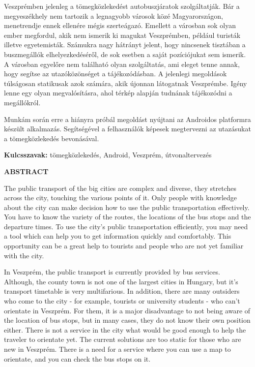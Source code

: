 \documentclass[a4paper,oneside,10pt]{report}
\begin{document}
Veszprémben jelenleg a tömegközlekedést autobuszjáratok szolgáltatják.
Bár a megyeszékhely nem tartozik a legnagyobb városok közé Magyarországon, menetrendje ennek ellenére mégis szerteágazó.
Emellett a városban sok olyan ember megfordul, akik nem ismerik ki magukat Veszprémben, például turisták illetve egyetemisták.
Számukra nagy hátrányt jelent, hogy nincsenek tisztában a buszmegállók elhelyezkedéséről, de sok esetben a saját pozíciójukat sem ismerik.
A városban egyelőre nem található olyan szolgáltatás, ami eleget tenne annak, hogy segítse az utazóközönséget a tájékozódásban.
A jelenlegi megoldások túlságosan statikusak azok számára, akik újonnan látogatnak Veszprémbe.
Igény lenne egy olyan megvalósításra, ahol térkép alapján tudnának tájékozódni a megállókról.

Munkám során erre a hiányra próbál megoldást nyújtani az Androidos platformra készült alkalmazás.
Segítségével a felhasználók képesek megtervezni az utazásukat a tömegközlekedés bevonásával.

\textbf{Kulcsszavak:} tömegközlekedés, Android, Veszprém, útvonaltervezés

\newpage

\Large
\begin{center}
	\textbf{ABSTRACT}
\end{center}
\normalsize
\noindent
The public transport of the big cities are complex and diverse, they stretches across the city, touching the various points of it.
Only people with knowledge about the city can make decision how to use the public transportation effectively.
You have to know the variety of the routes, the locations of the bus stops and the departure times.
To use the city's public transportation efficiently, you may need a tool which can help you to get information quickly and comfortably.
This opportunity can be a great help to tourists and people who are not yet familiar with the city.

In Veszprém, the public transport is currently provided by bus services.
Although, the county town is not one of the largest cities in Hungary, but it's transport timetable is very multifarious.
In addition, there are many outsiders who come to the city - for example, tourists or university students - who can't orientate in Veszprém.
For them, it is a major disadvantage to not being aware of the location of bus stops, but in many cases, they do not know their own position either.
There is not a service in the city what would be good enough to help the traveler to orientate yet.
The current solutions are too static for those who are new in Veszprém.
There is a need for a service where you can use a map to orientate, and you can check the bus stops on it.
\end{document}
